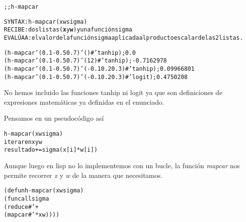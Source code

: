 \begin{aibox}{\function}
\begin{alltt}
;; h-mapcar

SYNTAX: h-mapcar (x w sigma) 
RECIBE: dos listas (\textbf{x} y \textbf{w}) y una función sigma
EVALÚA A: el valor de la función sigma aplicada al producto escalar de las 2 listas.
\end{alltt}
\end{aibox}

\begin{aibox}{\examples}
\begin{alltt}
(h-mapcar '(0.1 -0.5 0.7) '() #'tanhip); 0.0
(h-mapcar '(0.1 -0.5 0.7) '(1 2) #'tanhip); -0.7162978
(h-mapcar '(0.1 -0.5 0.7) '(-0.1 0.2 0.3) #'tanhip); 0.09966801
(h-mapcar '(0.1 -0.5 0.7) '(-0.1 0.2 0.3) #'logit); 0.4750208
\end{alltt}
\end{aibox}

\begin{aibox}{\comments}
No hemos incluido las funciones tanhip ni logit ya que son definiciones de expresiones matemáticas ya definidas en el enunciado.
\end{aibox}
\begin{aibox}{\pseudocode}
Pensamos en un pseudocódigo así
\begin{alltt}
h-mapcar (x w sigma)
    iterar en x y w
        resultado += sigma(x[i]*w[i])
   
\end{alltt}

Aunque luego en lisp no lo implementemos con un bucle, la función \emph{mapcar} nos permite recorrer \emph{x} y \emph{w} de la manera que necesitamos.
\end{aibox}
\begin{aibox}{\code}

\begin{alltt}
(defun h-mapcar (x w sigma) 
    (funcall sigma 
        (reduce #'+
            (mapcar #'* x w))))
\end{alltt}
\end{aibox}
